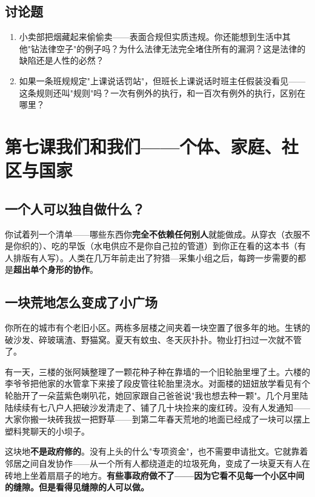 \documentclass[a4paper,12pt]{ctexart}
\begin{document}
\subsection*{讨论题}
\begin{enumerate}
  \item 小卖部把烟藏起来偷偷卖——表面合规但实质违规。你还能想到生活中其他"钻法律空子"的例子吗？为什么法律无法完全堵住所有的漏洞？这是法律的缺陷还是人性的必然？
  \item 如果一条班规规定"上课说话罚站"，但班长上课说话时班主任假装没看见——这条规则还叫"规则"吗？一次有例外的执行，和一百次有例外的执行，区别在哪里？
\end{enumerate}

\newpage
\section{\textcolor{orange!80!black}{第七课\quad 我们和我们——个体、家庭、社区与国家}}

\subsection*{一个人可以独自做什么？}

你试着列一个清单——哪些东西你\textbf{完全不依赖任何别人}就能做成。从穿衣（衣服不是你织的）、吃的早饭（水电供应不是你自己拉的管道）到你正在看的这本书（有人排版有人写）。人类在几万年前走出了狩猎—采集小组之后，每跨一步需要的都是\textbf{超出单个身形的协作}。

\subsection*{一块荒地怎么变成了小广场}

你所在的城市有个老旧小区。两栋多层楼之间夹着一块空置了很多年的地。生锈的破沙发、碎玻璃渣、野猫窝。夏天有蚊虫、冬天灰扑扑。物业打扫过一次就不管了。

有一天，三楼的张阿姨整理了一颗花种子种在靠墙的一个旧轮胎里埋了土。六楼的李爷爷把他家的水管拿下来接了段皮管往轮胎里浇水。对面楼的妞妞放学看见有个轮胎开了一朵蓝紫色喇叭花，她回家跟自己爸爸说"我也想去种一颗"。几个月里陆陆续续有七八户人把破沙发清走了、铺了几十块捡来的废红砖。没有人发通知——大家你搬一块砖我拔一把野草——到第二年春天荒地的地面已经成了一块可以摆上塑料凳聊天的小坝子。

这块地\textbf{不是政府修的}。没有上头的什么"专项资金"，也不需要申请批文。它就靠着邻居之间自发协作——从一个所有人都绕道走的垃圾死角，变成了一块夏天有人在砖地上坐着扇扇子的地方。\textbf{有些事政府做不了——因为它看不见每一个小区中间的缝隙。但是看得见缝隙的人可以做。}
\end{document}

